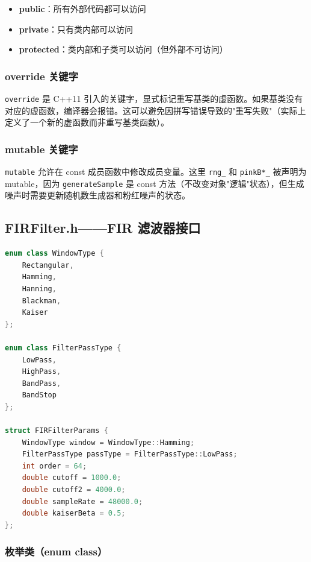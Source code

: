 ﻿\documentclass[12pt,a4paper,oneside]{ctexbook}
\begin{document}
\begin{itemize}
    \item \textbf{public}：所有外部代码都可以访问
    \item \textbf{private}：只有类内部可以访问
    \item \textbf{protected}：类内部和子类可以访问（但外部不可访问）
\end{itemize}

\subsubsection{override 关键字}

\texttt{override} 是 C++11 引入的关键字，显式标记重写基类的虚函数。如果基类没有对应的虚函数，编译器会报错。这可以避免因拼写错误导致的"重写失败"（实际上定义了一个新的虚函数而非重写基类函数）。

\subsubsection{mutable 关键字}

\texttt{mutable} 允许在 const 成员函数中修改成员变量。这里 \texttt{rng\_} 和 \texttt{pinkB*\_} 被声明为 mutable，因为 \texttt{generateSample} 是 const 方法（不改变对象"逻辑"状态），但生成噪声时需要更新随机数生成器和粉红噪声的状态。

\subsection{FIRFilter.h——FIR 滤波器接口}

\begin{lstlisting}[language=C++, caption={FIRFilter 类声明}]
enum class WindowType {
    Rectangular,
    Hamming,
    Hanning,
    Blackman,
    Kaiser
};

enum class FilterPassType {
    LowPass,
    HighPass,
    BandPass,
    BandStop
};

struct FIRFilterParams {
    WindowType window = WindowType::Hamming;
    FilterPassType passType = FilterPassType::LowPass;
    int order = 64;
    double cutoff = 1000.0;
    double cutoff2 = 4000.0;
    double sampleRate = 48000.0;
    double kaiserBeta = 0.5;
};
\end{lstlisting}

\subsubsection{枚举类（enum class）}
\end{document}
